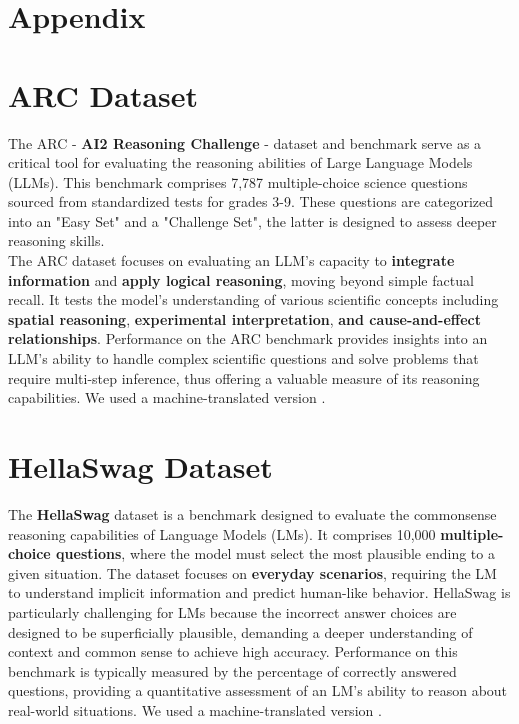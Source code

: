 \documentclass{article}
\begin{document}
	\section*{Appendix}
	
	\appendix
	
	\section{ARC Dataset}
	The ARC - \textbf{AI2 Reasoning Challenge} - dataset and benchmark serve as a critical tool for evaluating the reasoning abilities of Large Language Models (LLMs). This benchmark comprises 7,787 multiple-choice science questions sourced from standardized tests for grades 3-9.  These questions are categorized into an "Easy Set" and a "Challenge Set", the latter is designed to assess deeper reasoning skills.  \\
	The ARC dataset focuses on evaluating an LLM's capacity to \textbf{integrate information} and \textbf{apply logical reasoning}, moving beyond simple factual recall.  It tests the model's understanding of various scientific concepts including \textbf{spatial reasoning}, \textbf{experimental interpretation}, \textbf{and cause-and-effect relationships}.  Performance on the ARC benchmark provides insights into an LLM's ability to handle complex scientific questions and solve problems that require multi-step inference, thus offering a valuable measure of its reasoning capabilities.
	We used a machine-translated version \cite{dac2023okapi}.
	
	\section{HellaSwag Dataset}
	The \textbf{HellaSwag} dataset is a benchmark designed to evaluate the commonsense reasoning capabilities of Language Models (LMs). It comprises 10,000 \textbf{multiple-choice questions}, where the model must select the most plausible ending to a given situation.  The dataset focuses on \textbf{everyday scenarios}, requiring the LM to understand implicit information and predict human-like behavior.  HellaSwag is particularly challenging for LMs because the incorrect answer choices are designed to be superficially plausible, demanding a deeper understanding of context and common sense to achieve high accuracy.  Performance on this benchmark is typically measured by the percentage of correctly answered questions, providing a quantitative assessment of an LM's ability to reason about real-world situations.
	We used a machine-translated version \cite{dac2023okapi}.
	
	
	
\end{document}
